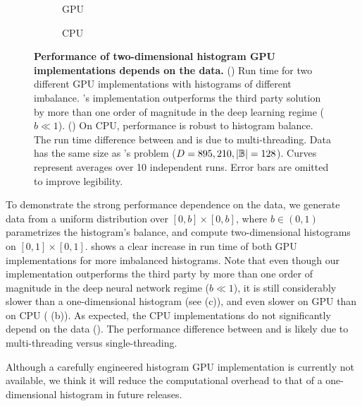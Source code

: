 \begin{figure*}
  \begin{subfigure}[t]{0.49\linewidth}
    \caption{GPU}
    \tikzexternalenable
    
    \tikzexternaldisable
    \label{cockpit::fig:app-histogram2d-benchmark-gpu}
  \end{subfigure}
  \hfill
  \begin{subfigure}[t]{0.49\linewidth}
    \caption{CPU}
    \tikzexternalenable
    
    \tikzexternaldisable
    \label{cockpit::fig:app-histogram2d-benchmark-cpu}
  \end{subfigure}
  \caption{\textbf{Performance of two-dimensional histogram GPU implementations
      depends on the data.} () Run
    time for two different GPU implementations with histograms of different
    imbalance. \cockpit's implementation outperforms the third party solution by
    more than one order of magnitude in the deep learning regime ($b \ll 1$).
    () On CPU, performance is robust
    to histogram balance. The run time difference between \numpy and \pytorch is
    due to multi-threading. Data has the same size as \deepobs's \cifarten
    \threecthreed problem ($D =895,210, |{\mathbb{B}}| = 128$). Curves represent averages
    over 10 independent runs. Error bars are omitted to improve legibility.}
  \label{cockpit::fig:app-histogram2d-benchmark}
\end{figure*}

To demonstrate the strong performance dependence on the data, we generate data
from a uniform distribution over $[0, b]\times[0, b]$, where $b \in (0, 1)$
parametrizes the histogram's balance, and compute two-dimensional histograms on
$[0,1]\times [0, 1]$.  shows a
clear increase in run time of both GPU implementations for more imbalanced
histograms. Note that even though our implementation outperforms the third party
by more than one order of magnitude in the deep neural network regime ($b \ll
1$), it is still considerably slower than a one-dimensional histogram (see
 (c)), and even slower on GPU
than on CPU ( (b)). As expected,
the CPU implementations do not significantly depend on the data
(). The performance difference
between \pytorch and \numpy is likely due to multi-threading versus
single-threading.

Although a carefully engineered histogram GPU implementation is currently not
available, we think it will reduce the computational overhead to that of a
one-dimensional histogram in future releases.

